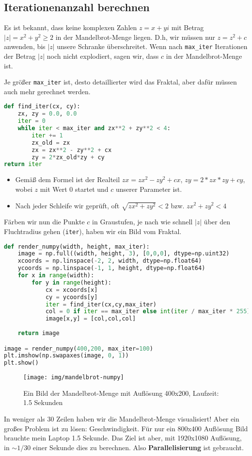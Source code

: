 \documentclass{article}
\begin{document}
\subsection{Iterationenanzahl berechnen}
Es ist bekannt, dass keine komplexen Zahlen $z = x + yi$ mit Betrag $|z| = x^2 + y^2 \geq 2$ in der Mandelbrot-Menge liegen. D.h, wir müssen nur $z = z^2 + c$  anwenden, bis $|z|$ unsere Schranke überschreitet. Wenn nach \lstinline|max_iter| Iterationen der Betrag $|z|$ noch nicht explodiert, sagen wir, dass $c$ in der Mandelbrot-Menge ist. 

Je größer \lstinline|max_iter| ist, desto detaillierter wird das Fraktal, aber dafür müssen auch mehr gerechnet werden. 
\begin{lstlisting}[language=Python, caption={Eine Schleife zur Berechnung der Iterationenanzahl}, captionpos=b] 
def find_iter(cx, cy):
	zx, zy = 0.0, 0.0
	iter = 0
	while iter < max_iter and zx**2 + zy**2 < 4:
		iter += 1
		zx_old = zx
		zx = zx**2 - zy**2 + cx
		zy = 2*zx_old*zy + cy
return iter
\end{lstlisting}
\begin{itemize}
\item Gemäß dem Formel ist der Realteil $zx = zx^2 - zy^2 + cx$, $zy = 2*zx*zy + cy$, wobei $z$ mit Wert $0$ startet und $c$ unserer Parameter ist. 
\item Nach jeder Schleife wir geprüft, oft $\sqrt{zx^2 + zy^2} < 2$ bzw. $zx^2 + zy^2 < 4$
\end{itemize}

Färben wir nun die Punkte $c$ in Graustufen, je nach wie schnell $|z|$ über den Fluchtradius gehen (\lstinline|iter|), haben wir ein Bild vom Fraktal.

\begin{lstlisting}[language=python, caption={Ergebnis in Abb. \ref{fig:mandelbrot-numpy} }, captionpos=b]
def render_numpy(width, height, max_iter):
    image = np.full((width, height, 3), [0,0,0], dtype=np.uint32)
    xcoords = np.linspace(-2, 2, width, dtype=np.float64)
    ycoords = np.linspace(-1, 1, height, dtype=np.float64)
    for x in range(width):
        for y in range(height):
            cx = xcoords[x]
            cy = ycoords[y]
            iter = find_iter(cx,cy,max_iter)
            col = 0 if iter == max_iter else int(iter / max_iter * 255)
            image[x,y] = [col,col,col]
    
    return image

image = render_numpy(400,200, max_iter=100)
plt.imshow(np.swapaxes(image, 0, 1))
plt.show()
\end{lstlisting}
\begin{figure}[!htb]
	\centering
	\texttt{[image: img/mandelbrot-numpy]}
	\caption{Ein Bild der Mandelbrot-Menge mit Auflösung 400x200, Laufzeit: 1.5  Sekunden}
	\label{fig:mandelbrot-numpy}
\end{figure}
In weniger als 30 Zeilen haben wir die Mandelbrot-Menge visualisiert! Aber ein großes Problem ist zu lösen: Geschwindigkeit. Für nur ein 800x400 Auflösung Bild brauchte mein Laptop 1.5 Sekunde. Das Ziel ist aber, mit 1920x1080 Auflösung, in $\sim 1/30$ einer Sekunde dies zu berechnen. Also \textbf{Parallelisierung} ist gebraucht. 
\end{document}
